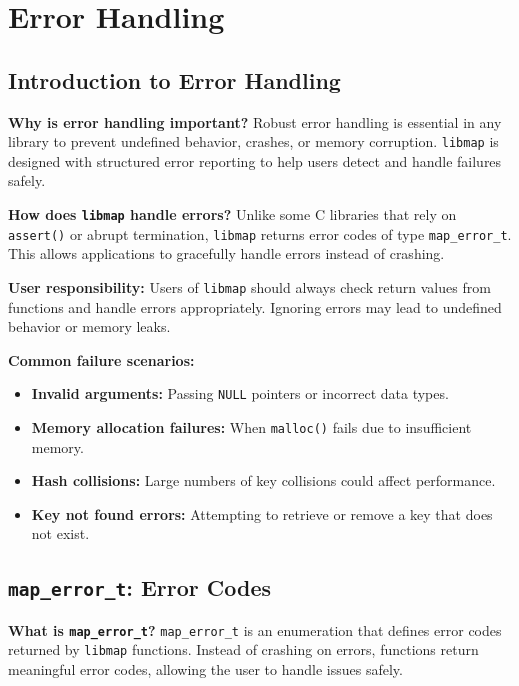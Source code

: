 \documentclass[titlepage]{article}
\begin{document}
\newpage
\section{Error Handling}

\subsection{Introduction to Error Handling}
\textbf{Why is error handling important?}
Robust error handling is essential in any library to prevent undefined behavior, crashes, or memory corruption.
\texttt{libmap} is designed with structured error reporting to help users detect and handle failures safely.

\textbf{How does \texttt{libmap} handle errors?}
Unlike some C libraries that rely on \texttt{assert()} or abrupt termination, \texttt{libmap} returns error codes of type \texttt{map\_error\_t}. This allows applications to gracefully handle errors instead of crashing.

\textbf{User responsibility:}
Users of \texttt{libmap} should always check return values from functions and handle errors appropriately. Ignoring errors may lead to undefined behavior or memory leaks.

\textbf{Common failure scenarios:}
\begin{itemize}
    \item \textbf{Invalid arguments:} Passing \texttt{NULL} pointers or incorrect data types.
    \item \textbf{Memory allocation failures:} When \texttt{malloc()} fails due to insufficient memory.
    \item \textbf{Hash collisions:} Large numbers of key collisions could affect performance.
    \item \textbf{Key not found errors:} Attempting to retrieve or remove a key that does not exist.
\end{itemize}

\subsection{\texttt{map\_error\_t}: Error Codes}

\textbf{What is \texttt{map\_error\_t}?}
\texttt{map\_error\_t} is an enumeration that defines error codes returned by \texttt{libmap} functions.
Instead of crashing on errors, functions return meaningful error codes, allowing the user to handle issues safely.
\end{document}
